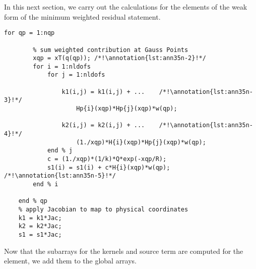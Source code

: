 In this next section, we carry out the calculations for the elements of the weak form of the minimum weighted residual statement.

\begin{lstlisting}[style=myMatlab,name=lec35n-ex]
    for qp = 1:nqp
        
        % sum weighted contribution at Gauss Points
        xqp = xT(q(qp)); /*!\annotation{lst:ann35n-2}!*/
        for i = 1:nldofs
            for j = 1:nldofs
                
                k1(i,j) = k1(i,j) + ...    /*!\annotation{lst:ann35n-3}!*/
                    Hp{i}(xqp)*Hp{j}(xqp)*w(qp);
                                
                k2(i,j) = k2(i,j) + ...    /*!\annotation{lst:ann35n-4}!*/
                    (1./xqp)*H{i}(xqp)*Hp{j}(xqp)*w(qp);
            end % j
            c = (1./xqp)*(1/k)*Q*exp(-xqp/R);
            s1(i) = s1(i) + c*H{i}(xqp)*w(qp);  /*!\annotation{lst:ann35n-5}!*/
        end % i
     
    end % qp
    % apply Jacobian to map to physical coordinates
    k1 = k1*Jac;
    k2 = k2*Jac;
    s1 = s1*Jac;

\end{lstlisting}
Now that the subarrays for the kernels and source term are computed for the element, we add them to the global arrays.

